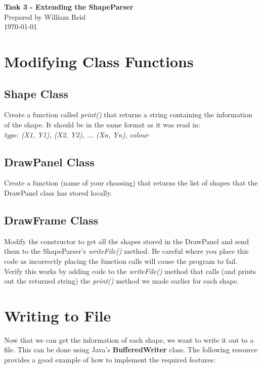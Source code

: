\documentclass[a4paper,12pt]{article}
\begin{document}
\begin{center}
{\LARGE\bf Task 3 - Extending the ShapeParser}\\
\vspace{0.5cm}
Prepared by William Reid\\
\today
\end{center}

\vspace{0.5cm}
\section{Modifying Class Functions}
\subsection{Shape Class}
Create a function called \textit{print()} that returns a string containing the information of the shape. It should be in the same format as it was read in:\\

\textit{type: (X1, Y1), (X2, Y2), ... (Xn, Yn), colour}

\subsection{DrawPanel Class}
Create a function (name of your choosing) that returns the list of shapes that the DrawPanel class has stored locally.

\subsection{DrawFrame Class}
Modify the constructor to get all the shapes stored in the DrawPanel and send them to the ShapeParser's \textit{writeFile()} method. Be careful where you place this code as incorrectly placing the function calls will cause the program to fail.\\

Verify this works by adding code to the \textit{writeFile()} method that calls (and prints out the returned string) the \textit{print()} method we made earlier for each shape.

\section{Writing to File}
Now that we can get the information of each shape, we want to write it out to a file. This can be done using Java's {\bf BufferedWriter} class. The following resource provides a good example of how to implement the required features:\\
\end{document}
